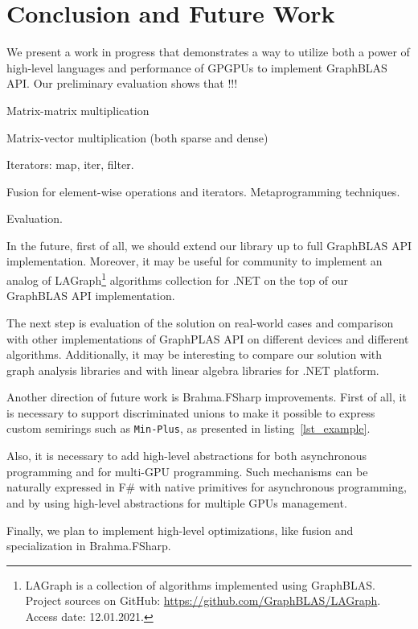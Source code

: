 \section{Conclusion and Future Work}

We present a work in progress that demonstrates a way to utilize both a power of high-level languages and performance of GPGPUs to implement GraphBLAS API.
Our preliminary evaluation shows that !!!

Matrix-matrix multiplication

Matrix-vector multiplication (both sparse and dense)

Iterators: map, iter, filter.

Fusion for element-wise operations and iterators. Metaprogramming techniques.

Evaluation.

In the future, first of all, we should extend our library up to full GraphBLAS API implementation.
Moreover, it may be useful for community to implement an analog of LAGraph\footnote{LAGraph is a collection of algorithms implemented using GraphBLAS. Project sources on GitHub: \url{https://github.com/GraphBLAS/LAGraph}. Access date: 12.01.2021.} algorithms collection for .NET on the top of our GraphBLAS API implementation.

The next step is evaluation of the solution on real-world cases and comparison with other implementations of GraphPLAS API on different devices and different algorithms.
Additionally, it may be interesting to compare our solution with graph analysis libraries and with linear algebra libraries for .NET platform.

Another direction of future work is Brahma.FSharp improvements. 
First of all, it is necessary to support discriminated unions to make it possible to express custom semirings such as \texttt{Min-Plus}, as presented in listing~\ref{lst_example}. 

Also, it is necessary to add high-level abstractions for both asynchronous programming and for multi-GPU programming.
Such mechanisms can be naturally expressed in F\# with native primitives for asynchronous programming, and by using high-level abstractions for multiple GPUs management.

Finally, we plan to implement high-level optimizations, like fusion and specialization in Brahma.FSharp.


